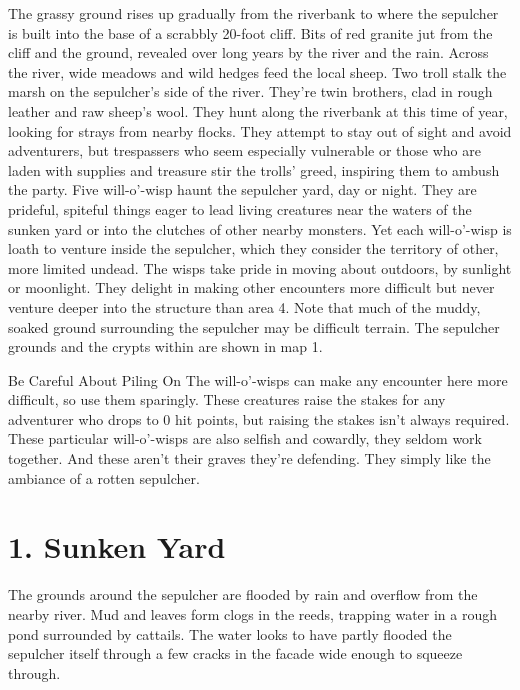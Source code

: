 \documentclass[10pt,a4paper,twoside,twocolumn,openany,bg=print,nodeprecatedcode]{dndbook}
\begin{document}
The grassy ground rises up gradually from the riverbank to where the sepulcher is built into the base of a scrabbly 20-foot cliff. Bits of red granite jut from the cliff and the ground, revealed over long years by the river and the rain. Across the river, wide meadows and wild hedges feed the local sheep.
Two troll stalk the marsh on the sepulcher's side of the river. They're twin brothers, clad in rough leather and raw sheep's wool. They hunt along the riverbank at this time of year, looking for strays from nearby flocks. They attempt to stay out of sight and avoid adventurers, but trespassers who seem especially vulnerable or those who are laden with supplies and treasure stir the trolls' greed, inspiring them to ambush the party.
Five will-o'-wisp haunt the sepulcher yard, day or night. They are prideful, spiteful things eager to lead living creatures near the waters of the sunken yard or into the clutches of other nearby monsters. Yet each will-o'-wisp is loath to venture inside the sepulcher, which they consider the territory of other, more limited undead. The wisps take pride in moving about outdoors, by sunlight or moonlight. They delight in making other encounters more difficult but never venture deeper into the structure than area 4.
Note that much of the muddy, soaked ground surrounding the sepulcher may be difficult terrain. The sepulcher grounds and the crypts within are shown in map 1.
\begin{DndComment}{Be Careful About Piling On}
The will-o'-wisps can make any encounter here more difficult, so use them sparingly. These creatures raise the stakes for any adventurer who drops to 0 hit points, but raising the stakes isn't always required. These particular will-o'-wisps are also selfish and cowardly, they seldom work together. And these aren't their graves they're defending. They simply like the ambiance of a rotten sepulcher.
\end{DndComment}

\section{1. Sunken Yard}
\begin{DndReadAloud}{}
The grounds around the sepulcher are flooded by rain and overflow from the nearby river. Mud and leaves form clogs in the reeds, trapping water in a rough pond surrounded by cattails. The water looks to have partly flooded the sepulcher itself through a few cracks in the facade wide enough to squeeze through.
\end{DndReadAloud}
\end{document}
